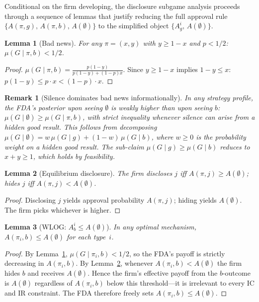 \documentclass[12pt,a4paper]{article}
\newtheorem{lemma}{Lemma}
\newtheorem{remark}{Remark}
\begin{document}
Conditional on the firm developing, the disclosure subgame
analysis proceeds through a sequence of lemmas that justify
reducing the full approval rule
$\{A(\pi,g),\,A(\pi,b),\,A(\emptyset)\}$ to the simplified
object $\{A_g^i,\,A(\emptyset)\}$.

\begin{lemma}[Bad news]\label{lem:bad_news}
For any $\pi = (x,y)$ with $y \geq 1 - x$ and $p < 1/2$:
$\mu(G \mid \pi, b) < 1/2$.
\end{lemma}

\begin{proof}
$\mu(G \mid \pi, b)
= \frac{p(1-y)}{p(1-y) + (1-p)x}$.
Since $y \geq 1-x$ implies $1-y \leq x$:
$p(1-y) \leq p \cdot x < (1-p) \cdot x$.
\end{proof}

\begin{remark}[Silence dominates bad news informationally]
\label{rem:silence}
In any strategy profile, the FDA's posterior upon seeing
$\emptyset$ is weakly higher than upon seeing $b$:
$\mu(G \mid \emptyset) \geq \mu(G \mid \pi, b)$,
with strict inequality whenever silence can arise from a
hidden good result. This follows from decomposing
$\mu(G\mid\emptyset) = w\,\mu(G\mid g) + (1-w)\,\mu(G\mid b)$,
where $w \geq 0$ is the probability weight on a hidden good
result. The sub-claim $\mu(G\mid g) \geq \mu(G\mid b)$
reduces to $x + y \geq 1$, which holds by feasibility.
\end{remark}

\begin{lemma}[Equilibrium disclosure]\label{lem:disclosure}
The firm discloses $j$ iff $A(\pi, j) \geq A(\emptyset)$;
hides $j$ iff $A(\pi, j) < A(\emptyset)$.
\end{lemma}

\begin{proof}
Disclosing $j$ yields approval probability $A(\pi,j)$;
hiding yields $A(\emptyset)$. The firm picks whichever is
higher.
\end{proof}

\begin{lemma}[WLOG: $A_b^i \leq A(\emptyset)$]
\label{lem:wlog_Ab}
In any optimal mechanism, $A(\pi_i, b) \leq A(\emptyset)$
for each type~$i$.
\end{lemma}

\begin{proof}
By Lemma~\ref{lem:bad_news}, $\mu(G \mid \pi_i, b) < 1/2$,
so the FDA's payoff is strictly decreasing in $A(\pi_i, b)$.
By Lemma~\ref{lem:disclosure}, whenever
$A(\pi_i, b) < A(\emptyset)$ the firm hides $b$ and
receives $A(\emptyset)$. Hence the firm's effective payoff
from the $b$-outcome is $A(\emptyset)$ regardless of
$A(\pi_i, b)$ below this threshold---it is irrelevant to
every IC and IR constraint. The FDA therefore freely sets
$A(\pi_i, b) \leq A(\emptyset)$.
\end{proof}
\end{document}
